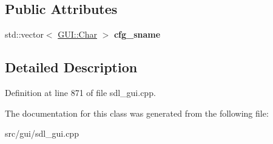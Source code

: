\subsection*{Public Attributes}
\begin{DoxyCompactItemize}
\item 
\hypertarget{classAutoexecEditor_af1d96f7032869aac93bba3fae830c902}{std\-::vector$<$ \hyperlink{namespaceGUI_af6b04b46d40197b4f00e553d7d1a3e4c}{G\-U\-I\-::\-Char} $>$ {\bfseries cfg\-\_\-sname}}\label{classAutoexecEditor_af1d96f7032869aac93bba3fae830c902}

\end{DoxyCompactItemize}


\subsection{Detailed Description}


Definition at line 871 of file sdl\-\_\-gui.\-cpp.



The documentation for this class was generated from the following file\-:\begin{DoxyCompactItemize}
\item 
src/gui/sdl\-\_\-gui.\-cpp\end{DoxyCompactItemize}
